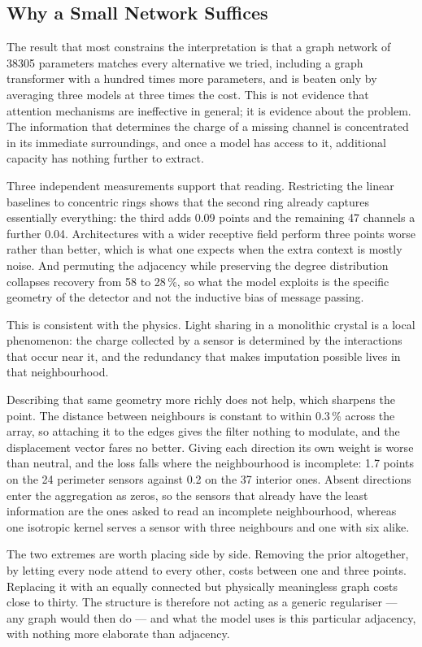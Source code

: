 \documentclass[10pt,conference]{IEEEtran}
\begin{document}
\subsection{Why a Small Network Suffices}

The result that most constrains the interpretation is that a graph network of
\num{38305} parameters matches every alternative we tried, including a graph
transformer with a hundred times more parameters, and is beaten only by
averaging three models at three times the cost. This is not evidence
that attention mechanisms are ineffective in general; it is evidence about the
problem. The information that determines the charge of a missing channel is
concentrated in its immediate surroundings, and once a model has access to it,
additional capacity has nothing further to extract.

Three independent measurements support that reading. Restricting the linear
baselines to concentric rings shows that the second ring already captures
essentially everything: the third adds 0.09 points and the remaining 47
channels a further 0.04. Architectures with a wider receptive field perform
three points worse rather than better, which is what one expects when the extra
context is mostly noise. And permuting the adjacency while preserving the
degree distribution collapses recovery from 58 to 28\,\%, so what the model
exploits is the specific geometry of the detector and not the inductive bias of
message passing.

This is consistent with the physics. Light sharing in a monolithic crystal is a
local phenomenon: the charge collected by a sensor is determined by the
interactions that occur near it, and the redundancy that makes imputation
possible lives in that neighbourhood.

Describing that same geometry more richly does not help, which sharpens the
point. The distance between neighbours is constant to within 0.3\,\% across the
array, so attaching it to the edges gives the filter nothing to modulate, and
the displacement vector fares no better. Giving each direction its own weight is
worse than neutral, and the loss falls where the neighbourhood is incomplete:
1.7 points on the 24 perimeter sensors against 0.2 on the 37 interior ones.
Absent directions enter the aggregation as zeros, so the sensors that already
have the least information are the ones asked to read an incomplete
neighbourhood, whereas one isotropic kernel serves a sensor with three
neighbours and one with six alike.

The two extremes are worth placing side by side. Removing the prior altogether,
by letting every node attend to every other, costs between one and three points.
Replacing it with an equally connected but physically meaningless graph costs
close to thirty. The structure is therefore not acting as a generic
regulariser --- any graph would then do --- and what the model uses is this
particular adjacency, with nothing more elaborate than adjacency.
\end{document}
